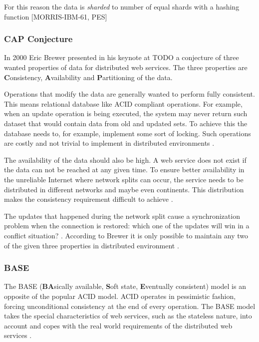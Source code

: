 \documentclass{tktltiki}
\begin{document}
For this reason the data is \emph{sharded} to number of equal shards with a hashing function [MORRIS-IBM-61, PES]


\subsubsection{CAP Conjecture}

In 2000 Eric Brewer presented in his keynote at TODO \cite{Bre02} a conjecture of three wanted properties of data for distributed web services.  The three properties are \textbf{C}onsistency, \textbf{A}vailability and \textbf{P}artitioning of the data.

Operations that modify the data are generally wanted to perform fully consistent.  This means relational database like ACID compliant operations.  For example, when an update operation is being executed, the system may never return such dataset that would contain data from old and updated sets.  To achieve this the database needs to, for example, implement some sort of locking.  Such operations are costly and not trivial to implement in distributed environments \cite{GiL02}.

The availability of the data should also be high.  A web service does not exist if the data can not be reached at any given time.  To ensure better availability in the unreliable Internet where network splits can occur, the service needs to be distributed in different networks and maybe even continents.  This distribution makes the consistency requirement difficult to achieve \cite{GiL02}.

The updates that happened during the network split cause a synchronization problem when the connection is restored: which one of the updates will win in a conflict situation? \cite{GiL02}.  According to Brewer it is only possible to maintain any two of the given three properties in distributed environment \cite{Bre02}.


\subsubsection{BASE}

The BASE (\textbf{BA}sically available, \textbf{S}oft state, \textbf{E}ventually consistent) model is an opposite of the popular ACID model.  ACID operates in pessimistic fashion, forcing unconditional consistency at the end of every operation.  The BASE model takes the special characteristics of web services, such as the stateless nature, into account and copes with the real world requirements of the distributed web services \cite{Pri08}.
\end{document}
